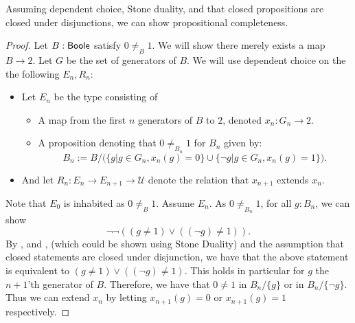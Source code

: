 \begin{lemma}\label{LLPOAndDCToCompleteness}
Assuming dependent choice, Stone duality, and that closed propositions are closed under disjunctions, 
we can show propositional completeness. 
\end{lemma}
\begin{proof}
  Let $B:\mathsf{Boole}$ satisfy $0\neq_B 1$. We will show there merely exists a map $B\to 2$. 
  Let $G$ be the set of generators of $B$. 
  We will use dependent choice on the the following $E_n,R_n$:
  \begin{itemize}
    \item 
  Let $E_n$ be the type consisting of 
  \begin{itemize}
    \item A map from the first $n$ generators of $B$ to $2$, denoted $x_n:G_n \to 2$. 
    \item A proposition denoting that $0\neq_{B_n} 1$ for $B_n$ given by:
      \begin{equation}
        B_n := B/\big( \{g|g\in G_n, x_n(g) = 0\} \cup \{ \neg g| g\in G_n, x_n(g) = 1\}\big).
      \end{equation}
  \end{itemize}
  \item 
    And let $R_n:E_n \to E_{n+1} \to \mathcal U$ denote the relation that $x_{n+1}$ extends $x_n$. 
  \end{itemize} 
  Note that $E_0$ is inhabited as $0\neq_B 1$. Assume $E_n$.
  As $0\neq_{B_n}1$, for all $g:B_n$, we can show 
  $$\neg \neg (( g\neq 1) \vee ((\neg g) \neq 1)).$$
  By , and , 
  (which could be shown using Stone Duality)
  and the assumption that 
  closed statements are closed under disjunction, we have that the above statement is equivalent to 
  $(g \neq 1) \vee ((\neg g) \neq 1)$. 
  This holds in particular for $g$ the $n+1$'th generator of $B$. 
  Therefore, we have that $0\neq 1$ in $B_n/\{g\}$ or in $B_n/\{\neg g\}$. 
  Thus we can extend $x_n$ by letting $x_{n+1}(g) = 0$ or $x_{n+1}(g) = 1$ respectively. 
  

\end{proof}
